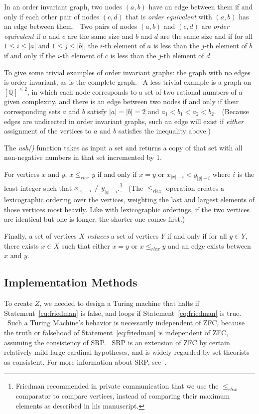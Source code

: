 \documentclass[11pt]{article}
\begin{document}
In an order invariant graph, two nodes $(a,b)$ have an edge between them if and only if each other pair of nodes $(c,d)$ that is \emph{order equivalent} with $(a,b)$ has an edge between them. \ Two pairs of nodes $(a, b)$ and $(c, d)$ are \emph{order equivalent} if $a$ and $c$ are the same size and $b$ and $d$ are the same size and if for all $1 \le i \le |a|$ and $1 \le j \le |b|$, the $i$-th element of $a$ is less than the $j$-th element of $b$ if and only if the $i$-th element of $c$ is less than the $j$-th element of $d$.

To give some trivial examples of order invariant graphs: the graph with no edges is order invariant, as is the complete graph. \ A less trivial example is a graph on $[\mathbb{Q}]^{\le 2}$, in which each node corresponds to a set of two rational numbers of a given complexity, and there is an edge between two nodes if and only if their corresponding sets $a$ and $b$ satisfy $|a| = |b| = 2$ and $a_1 < b_1 < a_2 < b_2$. \ (Because edges are undirected in order invariant graphs, such an edge will exist if \emph{either} assignment of the vertices to $a$ and $b$ satisfies the inequality above.)

The \emph{ush()} function takes as input a set and returns a copy of that set with all non-negative numbers in that set incremented by $1$.

For vertices $x$ and $y$, $x \le_{rlex} y$ if and only if $x = y$ or $x_{|x|-i} < y_{|y|-i}$ where $i$ is the least integer such that $x_{|x|-i} \not= y_{|y|-i}$.\footnote{Friedman recommended in private communication that we use the $\le_{rlex}$ comparator to compare vertices, instead of comparing their maximum elements as described in his manuscript.} \ (The $\le_{rlex}$ operation creates a lexicographic ordering over the vertices, weighting the last and largest elements of those vertices most heavily. Like with lexicographic orderings, if the two vertices are identical but one is longer, the shorter one comes first.)

Finally, a set of vertices $X$ \emph{reduces} a set of vertices $Y$ if and only if for all $y \in Y$, there exists $x \in X$ such that
either $x = y$ or $x \le_{rlex} y$ and an edge exists between $x$ and $y$.

\subsection{Implementation Methods}

To create $Z$, we needed to design a Turing machine that halts if Statement~\ref{eq:friedman} is false, and loops if Statement~\ref{eq:friedman} is true. \ Such a Turing Machine's behavior is necessarily independent of ZFC, because the truth or falsehood of Statement~\ref{eq:friedman} is independent of ZFC, assuming the consistency of SRP.~\cite{friedman} SRP is an extension of ZFC by certain relatively mild large cardinal hypotheses, and is widely regarded by set theorists as consistent. For more information about SRP, see~\cite{srp}.
\end{document}
